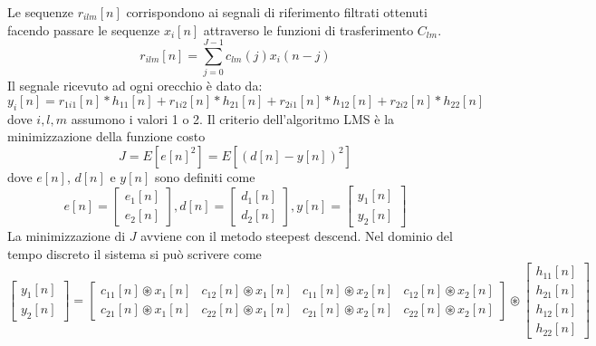 \documentclass[12pt,a4paper,titlepage]{article}
\begin{document}
Le sequenze $r_{ilm}[n]$ corrispondono ai segnali di riferimento filtrati ottenuti facendo passare le sequenze $x_i[n]$ attraverso le funzioni di trasferimento $C_{lm}$.
\begin{equation}
r_{ilm}[n]=\sum_{j=0}^{J-1}c_{lm}(j)x_i(n-j)
\end{equation}
Il segnale ricevuto ad ogni orecchio è dato da:
\begin{equation}
y_i[n]=r_{1i1}[n]*h_{11}[n]+r_{1i2}[n]*h_{21}[n]+
r_{2i1}[n]*h_{12}[n]+r_{2i2}[n]*h_{22}[n]
\end{equation}
dove $i,l,m$ assumono i valori 1 o 2.
Il criterio dell'algoritmo LMS è la minimizzazione della funzione costo
\begin{equation}
J=E[e[n]^2]=E[(d[n]-y[n])^2]
\end{equation}
dove $e[n]$, $d[n]$ e $y[n]$ sono definiti come
\begin{equation}
e[n]=
\begin{bmatrix}
e_1[n]\\
e_2[n]
\end{bmatrix},
d[n]=
\begin{bmatrix}
d_1[n]\\
d_2[n]
\end{bmatrix},
y[n]=
\begin{bmatrix}
y_1[n]\\
y_2[n]
\end{bmatrix}
\end{equation}
La minimizzazione di $J$ avviene con il metodo steepest descend.
Nel dominio del tempo discreto il sistema si può scrivere come
\begin{equation}
\begin{bmatrix}
	y_1[n]     \\
	y_2[n]    
\end{bmatrix}
= 
\begin{bmatrix}
	c_{11}[n] \circledast x_1[n]  &  c_{12}[n] \circledast x_1[n]  & c_{11}[n] \circledast x_2[n]  & c_{12}[n] \circledast x_2[n]    \\
	c_{21}[n] \circledast x_1[n]  &  c_{22}[n] \circledast x_1[n]  & c_{21}[n] \circledast x_2[n]  & c_{22}[n] \circledast x_2[n]     
\end{bmatrix} 
\circledast
\begin{bmatrix}
	h_{11}[n] \\
	h_{21}[n] \\
	h_{12}[n] \\
	h_{22}[n]  
\end{bmatrix} 
\end{equation}
\end{document}
